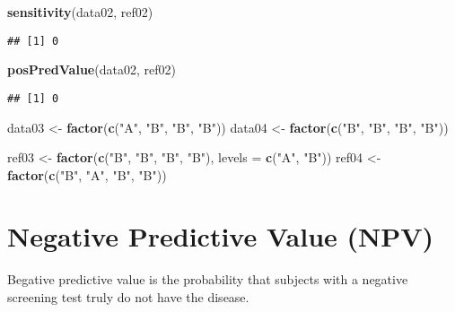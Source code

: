 \documentclass[]{article}
\newenvironment{Shaded}{\begin{snugshade}}{\end{snugshade}}
\newcommand{\DataTypeTok}[1]{\textcolor[rgb]{0.13,0.29,0.53}{#1}}
\newcommand{\KeywordTok}[1]{\textcolor[rgb]{0.13,0.29,0.53}{\textbf{#1}}}
\newcommand{\NormalTok}[1]{#1}
\newcommand{\StringTok}[1]{\textcolor[rgb]{0.31,0.60,0.02}{#1}}
\begin{document}
\begin{Shaded}
\begin{Highlighting}[]
\KeywordTok{sensitivity}\NormalTok{(data02, ref02) }
\end{Highlighting}
\end{Shaded}

\begin{verbatim}
## [1] 0
\end{verbatim}

\begin{Shaded}
\begin{Highlighting}[]
\KeywordTok{posPredValue}\NormalTok{(data02, ref02) }
\end{Highlighting}
\end{Shaded}

\begin{verbatim}
## [1] 0
\end{verbatim}

\begin{Shaded}
\begin{Highlighting}[]
\NormalTok{data03 <-}\StringTok{ }\KeywordTok{factor}\NormalTok{(}\KeywordTok{c}\NormalTok{(}\StringTok{"A"}\NormalTok{, }\StringTok{"B"}\NormalTok{, }\StringTok{"B"}\NormalTok{, }\StringTok{"B"}\NormalTok{))}
\NormalTok{data04 <-}\StringTok{ }\KeywordTok{factor}\NormalTok{(}\KeywordTok{c}\NormalTok{(}\StringTok{"B"}\NormalTok{, }\StringTok{"B"}\NormalTok{, }\StringTok{"B"}\NormalTok{, }\StringTok{"B"}\NormalTok{))}

\NormalTok{ref03 <-}\StringTok{ }\KeywordTok{factor}\NormalTok{(}\KeywordTok{c}\NormalTok{(}\StringTok{"B"}\NormalTok{, }\StringTok{"B"}\NormalTok{, }\StringTok{"B"}\NormalTok{, }\StringTok{"B"}\NormalTok{), }\DataTypeTok{levels =} \KeywordTok{c}\NormalTok{(}\StringTok{"A"}\NormalTok{, }\StringTok{"B"}\NormalTok{))}
\NormalTok{ref04 <-}\StringTok{ }\KeywordTok{factor}\NormalTok{(}\KeywordTok{c}\NormalTok{(}\StringTok{"B"}\NormalTok{, }\StringTok{"A"}\NormalTok{, }\StringTok{"B"}\NormalTok{, }\StringTok{"B"}\NormalTok{))}
\end{Highlighting}
\end{Shaded}

\hypertarget{negative-predictive-value-npv}{%
\section{Negative Predictive Value
(NPV)}\label{negative-predictive-value-npv}}

Begative predictive value is the probability that subjects with a
negative screening test truly do not have the disease.
\end{document}
